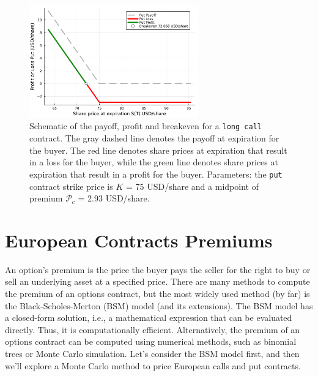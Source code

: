 \documentclass[11pt]{article}
\theoremstyle{definition}
\begin{document}
\begin{figure}[ht]
    \centering
    \includegraphics[width=0.65\textwidth]{./figs/Fig-Example-Put-K75-62DTE.pdf}
    \caption{Schematic of the payoff, profit and breakeven for a \texttt{long call} 
	contract. The gray dashed line denotes the payoff at expiration for the buyer.
	The red line denotes share prices at expiration that result in a loss for the buyer, 
	while the green line denotes share prices at expiration that result in a profit for the buyer.
	Parameters: the \texttt{put} 
	contract strike price is $K$ = 75 USD/share and a midpoint of premium $\mathcal{P}_{c}$ = 2.93 USD/share.}\label{fig:put-payoff-profit-breakeven-diagram}
\end{figure}


\section*{European Contracts Premiums}
An option's premium is the price the buyer pays the seller for the right to buy or sell an underlying asset at a specified price.
There are many methods to compute the premium of an options contract, but the most widely used method (by far) is the Black-Scholes-Merton (BSM) model (and its extensions).
The BSM model has a closed-form solution, i.e., a mathematical expression that can be evaluated directly. Thus, it is computationally efficient.
Alternatively, the premium of an options contract can be computed using numerical methods, such as binomial trees or Monte Carlo simulation.
Let's consider the BSM model first, and then we'll explore a Monte Carlo method to price European calls and put contracts.
\end{document}
